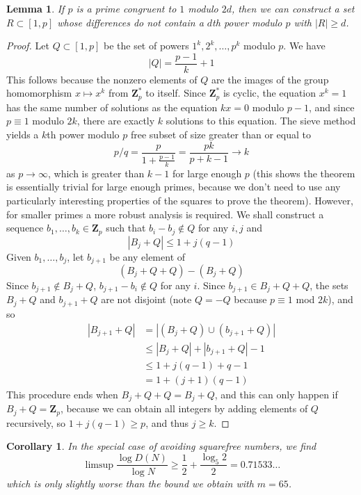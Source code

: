 \documentclass{report}
\theoremstyle{plain}
\newtheorem{lemma}{Lemma}
\newtheorem*{corollary}{Corollary}
\theoremstyle{plain}
\begin{document}
\begin{lemma}
    If $p$ is a prime congruent to $1$ modulo $2d$, then we can construct a set $R \subset [1,p]$ whose differences do not contain a $d$th power modulo $p$ with $|R| \geq d$.
\end{lemma}
\begin{proof}
    Let $Q \subset [1,p]$ be the set of powers $1^k, 2^k, \dots, p^k$ modulo $p$. We have
    \[ |Q| = \frac{p-1}{k} + 1 \]
    This follows because the nonzero elements of $Q$ are the images of the group homomorphism $x \mapsto x^k$ from $\mathbf{Z}_p^*$ to itself. Since $\mathbf{Z}_p^*$ is cyclic, the equation $x^k = 1$ has the same number of solutions as the equation $kx = 0$ modulo $p-1$, and since $p \equiv 1$ modulo $2k$, there are exactly $k$ solutions to this equation. The sieve method yields a $k$th power modulo $p$ free subset of size greater than or equal to
    \[ p/q = \frac{p}{1 + \frac{p-1}{k}} = \frac{pk}{p + k - 1} \to k \]
    as $p \to \infty$, which is greater than $k-1$ for large enough $p$ (this shows the theorem is essentially trivial for large enough primes, because we don't need to use any particularly interesting properties of the squares to prove the theorem). However, for smaller primes a more robust analysis is required. We shall construct a sequence $b_1, \dots, b_k \in \mathbf{Z}_p$ such that $b_i - b_j \not \in Q$ for any $i,j$ and
    \[ |B_j + Q| \leq 1 + j(q-1) \]
    Given $b_1, \dots, b_j$, let $b_{j+1}$ be any element of
    \[ (B_j + Q + Q) - (B_j + Q) \]
    Since $b_{j+1} \not \in B_j + Q$, $b_{j+1} - b_i \not \in Q$ for any $i$. Since $b_{j+1} \in B_j + Q + Q$, the sets $B_j + Q$ and $b_{j+1} + Q$ are not disjoint (note $Q = -Q$ because $p \equiv 1$ mod $2k$), and so
    \begin{align*}
        |B_{j+1} + Q| &= |(B_j + Q) \cup (b_{j+1} + Q)|\\
        &\leq |B_j + Q| + |b_{j+1} + Q| - 1\\
        &\leq 1 + j(q-1) + q - 1\\
        &= 1 + (j+1)(q-1)
    \end{align*}
    This procedure ends when $B_j + Q + Q = B_j + Q$, and this can only happen if $B_j + Q = \mathbf{Z}_p$, because we can obtain all integers by adding elements of $Q$ recursively, so $1 + j(q-1) \geq p$, and thus $j \geq k$.
\end{proof}

\begin{corollary}
    In the special case of avoiding squarefree numbers, we find 
    \[ \limsup \frac{\log D(N)}{\log N} \geq \frac{1}{2} + \frac{\log_5 2}{2} = 0.71533\dots \]
    which is only slightly worse than the bound we obtain with $m = 65$.
\end{corollary}
\end{document}
